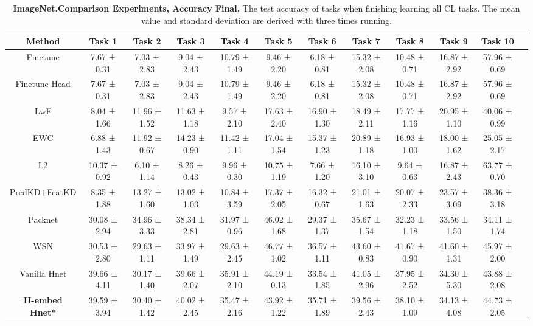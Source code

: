 \begin{sidewaystable}[ht]
\centering
\renewcommand{\arraystretch}{1.6}
\setlength{\tabcolsep}{0.9\tabcolsep}
\begin{adjustbox}{max width=\textwidth}
\begin{tabular}{|c|c|c|c|c|c|c|c|c|c|c|c|}
\hline
Method & Task 1 & Task 2 & Task 3 & Task 4 & Task 5 & Task 6 & Task 7 & Task 8 & Task 9 & Task 10 \\
\hline
Finetune & 7.67 ± 0.31 & 7.03 ± 2.83 & 9.04 ± 2.43 & 10.79 ± 1.49 & 9.46 ± 2.20 & 6.18 ± 0.81 & 15.32 ± 2.08 & 10.48 ± 0.71 & 16.87 ± 2.92 & 57.96 ± 0.69 \\
\hline
Finetune Head & 7.67 ± 0.31 & 7.03 ± 2.83 & 9.04 ± 2.43 & 10.79 ± 1.49 & 9.46 ± 2.20 & 6.18 ± 0.81 & 15.32 ± 2.08 & 10.48 ± 0.71 & 16.87 ± 2.92 & 57.96 ± 0.69 \\
\hline
LwF & 8.04 ± 1.66 & 11.96 ± 1.52 & 11.63 ± 1.18 & 9.57 ± 2.10 & 17.63 ± 2.40 & 16.90 ± 1.30 & 18.49 ± 2.11 & 17.77 ± 1.16 & 20.95 ± 1.10 & 40.06 ± 0.99 \\
\hline
EWC & 6.88 ± 1.43 & 11.92 ± 0.67 & 14.23 ± 0.90 & 11.42 ± 1.11 & 17.04 ± 1.54 & 15.37 ± 1.23 & 20.89 ± 1.18 & 16.93 ± 1.00 & 18.00 ± 1.62 & 25.05 ± 2.17 \\
\hline
L2 & 10.37 ± 0.92 & 6.10 ± 1.14 & 8.26 ± 0.43 & 9.96 ± 0.30 & 10.75 ± 1.19 & 7.66 ± 1.20 & 16.10 ± 3.10 & 9.64 ± 0.63 & 16.87 ± 2.43 & 63.77 ± 0.70 \\
\hline
PredKD+FeatKD & 8.35 ± 1.88 & 13.27 ± 1.60 & 13.02 ± 1.03 & 10.84 ± 3.59 & 17.37 ± 2.05 & 16.32 ± 0.67 & 21.01 ± 1.63 & 20.07 ± 2.33 & 23.57 ± 3.09 & 38.36 ± 3.18 \\
\hline
Packnet & 30.08 ± 2.94 & 34.96 ± 3.33 & 38.34 ± 2.81 & 31.97 ± 0.96 & 46.02 ± 1.68 & 29.37 ± 1.37 & 35.67 ± 1.54 & 32.23 ± 1.18 & 33.56 ± 1.50 & 34.11 ± 1.74 \\
\hline
WSN & 30.53 ± 2.80 & 29.63 ± 1.11 & 33.97 ± 1.49 & 29.63 ± 2.45 & 46.77 ± 1.02 & 36.57 ± 1.11 & 43.60 ± 0.83 & 41.67 ± 0.90 & 41.60 ± 1.31 & 45.97 ± 2.00 \\
\hline
Vanilla Hnet & 39.66 ± 4.11 & 30.17 ± 1.40 & 39.66 ± 2.07 & 35.91 ± 2.10 & 44.19 ± 0.13 & 33.54 ± 1.85 & 41.05 ± 2.96 & 37.95 ± 2.52 & 34.30 ± 5.30 & 43.88 ± 2.08 \\
\hline
\textbf{H-embed Hnet*} &  39.59 ± 3.94 & 30.40 ± 1.42 & 40.02 ± 2.45 & 35.47 ± 2.16 & 43.92 ± 1.22 & 35.71 ± 1.89 & 39.56 ± 2.43 & 38.10 ± 1.09 & 34.13 ± 4.08 & 44.73 ± 2.05 \\

\hline
\end{tabular}
\end{adjustbox}
\caption{\textbf{ImageNet.Comparison Experiments, Accuracy Final.} The test accuracy of tasks when finishing learning all CL tasks. The mean value and standard deviation are derived with three times running.}
\end{sidewaystable}


